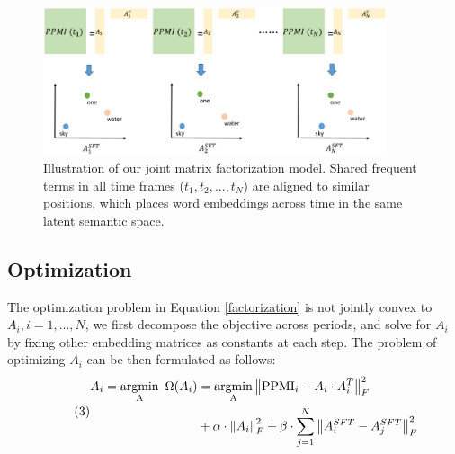 \documentclass[output=paper]{langsci/langscibook}
\begin{document}

\begin{figure}[ht]
\centering
\includegraphics[width=0.9\textwidth,height=0.9\textheight,keepaspectratio]{figures/DUAN_MF}
\caption{Illustration of our joint matrix factorization model. Shared frequent terms in all time frames ($t_{1}, t_{2}, ..., t_{N}$) are aligned to similar positions, which places word embeddings across time in the same latent semantic space.}\label{MF}
\end{figure}

\subsection{Optimization}

The optimization problem in Equation \eqref{factorization} is not jointly convex to $A_{i}, i = 1, ..., N$, we first decompose the objective across periods, and solve for $A_{i}$ by fixing other embedding matrices as constants at each step. The problem of optimizing $A_{i}$ can be then formulated as follows:
\begin{equation}\tag{3}
\begin{aligned}
A_{i} = \operatorname{\underset{A}{argmin}}\ \Omega(A_{i}) &= \operatorname{\underset{A}{argmin}}\left \|\textup{PPMI}_{i} - A_{i}\cdot A_{i}^{T}  \right \|_{F}^{2} \\&+ \alpha \cdot \left \| A_{i} \right \|_{F}^{2} + \beta \cdot \sum_{j = 1}^{N}\left \| A_{i}^{SFT} -  A_{j}^{SFT}\right \|_{F}^{2}
\label{factorization_each_step}
\end{aligned}
\end{equation}
\end{document}
